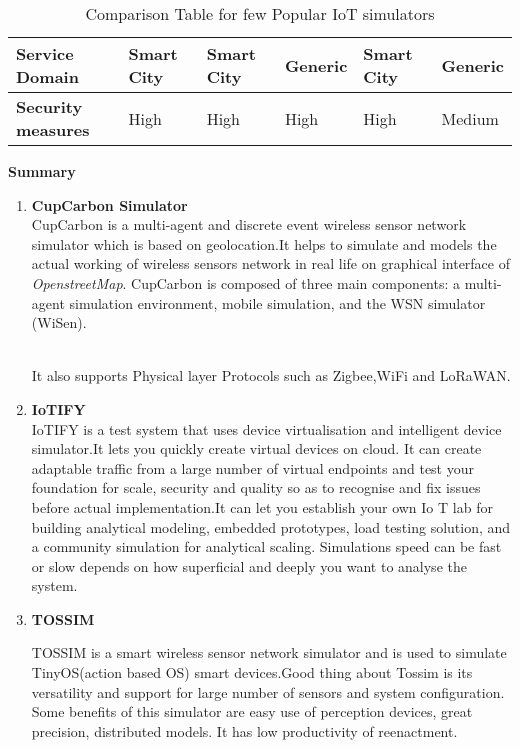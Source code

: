 \documentclass[a4paper,11pt]{article}
\begin{document}
\begin{iotsolution}
\begin{table}[htbp]
{\begin{tabular}{|p{2.7cm}|p{2.5cm}|p{2cm}|p{2.6cm}|p{2.3cm}|p{2.2cm}|}
\textbf{Service Domain}              & Smart City                                                          & Smart City          & Generic               & Smart City        & Generic                                 \\ \hline
\textbf{Security measures}           & High                                                                & High                & High                  & High              & Medium                                  \\ \hline
\end{tabular}
}
\caption{Comparison Table for few Popular IoT simulators}
\end{table}
\clearpage
\centering\large{\textbf{Summary}}
\begin{enumerate}[1]
\item{\textbf{CupCarbon Simulator}}\\


CupCarbon is a multi-agent and discrete event wireless sensor network simulator which is based on geolocation.It helps to simulate and models the actual working of wireless sensors network in real life on graphical interface of \emph{OpenstreetMap}.
CupCarbon is composed
of three main components: a multi-agent simulation environment,
mobile simulation, and the WSN simulator
(WiSen).
  
\\It also supports Physical layer Protocols such as Zigbee,WiFi and LoRaWAN.


\item{\textbf{IoTIFY}}\\
IoTIFY is a test system that uses device virtualisation and intelligent device simulator.It lets you quickly create virtual devices on cloud. It can create adaptable traffic from a large number of virtual endpoints and test your foundation for
scale, security and quality so as to recognise and fix issues before actual implementation.It can let you establish your own Io
T lab for building analytical modeling,
embedded prototypes, load testing solution, and a community
simulation for analytical scaling. Simulations speed can be fast or slow depends on how superficial and deeply you want to analyse the system.

\item{\textbf{TOSSIM}}

TOSSIM is a smart wireless sensor network simulator and is used to simulate TinyOS(action based OS) smart devices.Good thing about Tossim is its versatility and support for large number of sensors and system configuration. Some benefits of this simulator are easy use of perception devices, great precision, distributed models. It has low productivity of reenactment. 


\end{enumerate}
\end{iotsolution}
\end{document}
